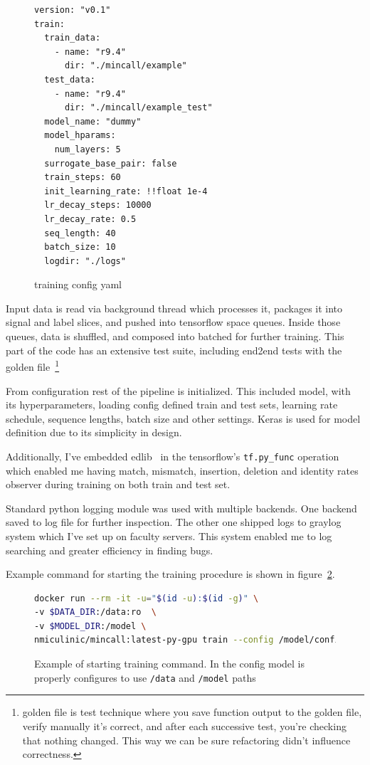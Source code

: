 \documentclass[times, utf8, diplomski, english]{fer}
\begin{document}
\begin{figure}
    \begin{center}
    \begin{lstlisting}[]
version: "v0.1"
train:
  train_data:
    - name: "r9.4"
      dir: "./mincall/example"
  test_data:
    - name: "r9.4"
      dir: "./mincall/example_test"
  model_name: "dummy"
  model_hparams:
    num_layers: 5
  surrogate_base_pair: false
  train_steps: 60
  init_learning_rate: !!float 1e-4
  lr_decay_steps: 10000
  lr_decay_rate: 0.5
  seq_length: 40
  batch_size: 10
  logdir: "./logs"
    \end{lstlisting}
    \caption{training config yaml}
    \label{fg:train_cfg_yml}
    \end{center}
\end{figure}

Input data is read via background thread which processes it, packages it into signal and label slices, and pushed into tensorflow space queues. Inside those queues, data is shuffled, and composed into batched for further training. This part of the code has an extensive test suite, including end2end tests with the golden file~\footnote{golden file is test technique where you save function output to the golden file, verify manually it's correct, and after each successive test, you're checking that nothing changed. This way we can be sure refactoring didn't influence correctness.}

From configuration rest of the pipeline is initialized. This included model, with its hyperparameters, loading config defined train and test sets, learning rate schedule, sequence lengths, batch size and other settings. Keras is used for model definition due to its simplicity in design. 

Additionally, I've embedded edlib~\citep{edlib} in the tensorflow's \texttt{tf.py\_func} operation which enabled me having match, mismatch, insertion, deletion and identity rates observer during training on both train and test set.

Standard python logging module was used with multiple backends. One backend saved to log file for further inspection. The other one shipped logs to graylog system which I've set up on faculty servers. This system enabled me to log searching and greater efficiency in finding bugs. 

Example command for starting the training procedure is shown in figure~\ref{fg:train_cfg_sh}.

\begin{figure}
    \begin{center}
    \begin{lstlisting}[language=bash,style=protobuf]
docker run --rm -it -u="$(id -u):$(id -g)" \
-v $DATA_DIR:/data:ro  \
-v $MODEL_DIR:/model \ 
nmiculinic/mincall:latest-py-gpu train --config /model/config.yml
    \end{lstlisting}
    \caption{Example of starting training command. In the config model is properly configures to use \texttt{/data} and \texttt{/model} paths}
    \label{fg:train_cfg_sh}
    \end{center}
\end{figure}
\end{document}
